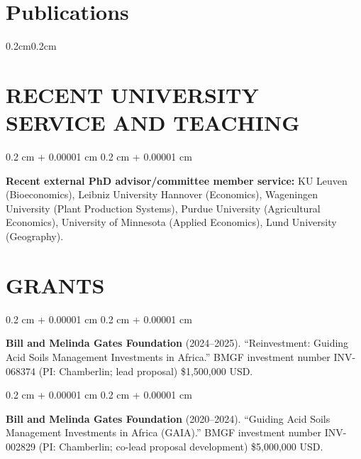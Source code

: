 \documentclass[10pt, letterpaper]{article}
\newcommand*{\boldname}[3]{%
  \def\lastname{#1}%
  \def\firstname{#2}%
  \def\firstinit{#3}}
\newenvironment{onecolentry}{
    \begin{adjustwidth}{
        0.2 cm + 0.00001 cm
    }{
        0.2 cm + 0.00001 cm
    }
}{
    \end{adjustwidth}
} %
\begin{document}
    \section{Publications}




\begin{adjustwidth}{0.2cm}{0.2cm}
\nocite{*}
\boldname{Chamberlin}{J.}{}
\printbibliography[heading={subbibliography},title={Journal Articles},type=article]
\printbibliography[heading={subbibliography},title={Journal Special Issues},type=misc]
\printbibliography[heading={subbibliography},title={Books},type=book]
\printbibliography[heading={subbibliography},title={Book Chapters},type=incollection]
\end{adjustwidth}


    
    \section{RECENT UNIVERSITY SERVICE AND TEACHING}

        \begin{onecolentry}
            \textbf{Recent external PhD advisor/committee member service:} KU Leuven (Bioeconomics), Leibniz University Hannover (Economics), Wageningen University (Plant Production Systems), Purdue University (Agricultural Economics), University of Minnesota (Applied Economics), Lund University (Geography).
        \end{onecolentry}


    \section{GRANTS}

        \begin{onecolentry}
            \textbf{Bill and Melinda Gates Foundation} (2024--2025). ``Reinvestment: Guiding Acid Soils Management Investments in Africa.'' BMGF investment number INV-068374 (PI: Chamberlin; lead proposal) \$1,500,000 USD.
        \end{onecolentry}

        \vspace{0.15 cm}

        \begin{onecolentry}
            \textbf{Bill and Melinda Gates Foundation} (2020--2024). ``Guiding Acid Soils Management Investments in Africa (GAIA).'' BMGF investment number INV-002829 (PI: Chamberlin; co-lead proposal development) \$5,000,000 USD.
        \end{onecolentry}
\end{document}
